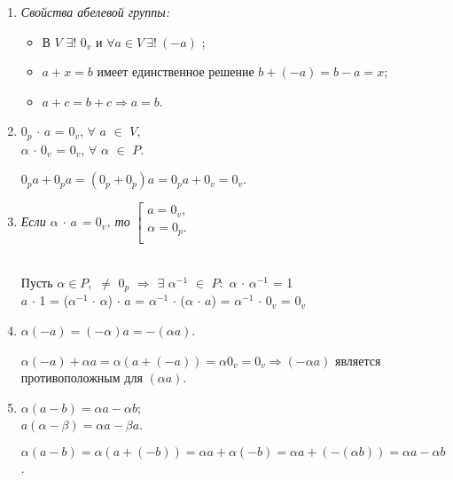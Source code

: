 \begin{enumerate}
	\item \textit{Свойства абелевой группы:}\begin{itemize} 
		\item В $V$ $\exists!$ $0_v$ и $\forall a\in V\ \exists!\ (-a)$ ;
		\item $a+x=b$ имеет единственное решение $b+(-a) = b-a = x$;
		\item $a+c = b+c \Rightarrow a=b$.
	\end{itemize}
	\item $0_p$ $\cdot$ $a$ = $0_v$, $\forall$ $a$ $\in$ $V$, 
	\\$\alpha$ $\cdot$ $0_v$ = $0_v$, $\forall$ $\alpha$ $\in$ $P$.
	
	\begin{Proof}
		$0_p a + 0_p a = (0_p + 0_p) a = 0_p a + 0_v = 0_v$.
	\end{Proof}
	
	\item \textit{Если $\alpha$ $\cdot$ $a$ = $0_v$, то}
	$\left[ 
	\begin{gathered} 
		a = 0_v,\\
		\alpha = 0_p.\\
	\end{gathered} 
	\right.$
	\\\\
	\begin{Proof} Пусть $\alpha\in P,$ $\ne$ $0_p$ $\Rightarrow$ $\exists$ $\alpha^{-1}$ $\in$ $P:$ $\alpha$ $\cdot$ $\alpha^{-1}$ = 1
		\\ $a$ $\cdot$ 1 = ($\alpha^{-1}$ $\cdot$ $\alpha$) $\cdot$ $a$ = $\alpha^{-1}$ $\cdot$ ($\alpha$ $\cdot$ $a$) = $\alpha^{-1}$ $\cdot$ $0_v$ = $0_v$ \end{Proof}
	\item $\alpha(-a) = (-\alpha)a = -(\alpha a)$.
	
	\begin{Proof} $\alpha (-a) + \alpha a = \alpha (a + (-a)) = \alpha 0_v = 0_v\Rightarrow (-\alpha a)$ является противоположным для $(\alpha a)$. \end{Proof}
	
	\item $\alpha (a-b) = \alpha a - \alpha b$; \\ $a(\alpha - \beta) = \alpha a - \beta a$.
	
	\begin{Proof}
		$\alpha(a-b) = \alpha(a + (-b)) = \alpha a + \alpha (-b) = \alpha a + (- (\alpha b)) = \alpha a - \alpha b$.
	\end{Proof}
	

\end{enumerate}
